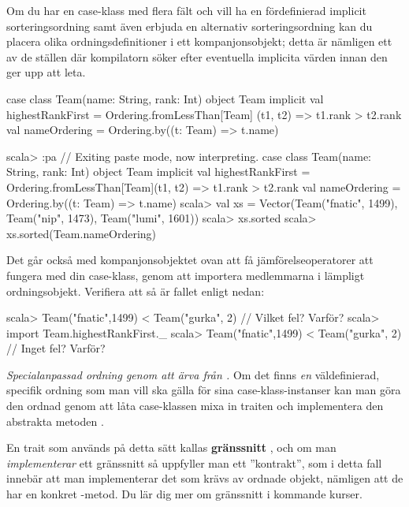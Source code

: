 \Subtask Om du har en case-klass med flera fält och vill ha en fördefinierad implicit sorteringsordning samt även erbjuda en alternativ sorteringsordning kan du placera olika ordningsdefinitioner i ett kompanjonsobjekt; detta är nämligen ett av de ställen där kompilatorn söker efter eventuella implicita värden innan den ger upp att leta. 
\begin{Code}
case class  Team(name: String, rank: Int)
object Team {
  implicit val highestRankFirst = Ordering.fromLessThan[Team]{
    (t1, t2) => t1.rank > t2.rank
  }
  val nameOrdering = Ordering.by((t: Team) => t.name)
}
\end{Code}
\begin{REPL}
scala> :pa
// Exiting paste mode, now interpreting.
case class  Team(name: String, rank: Int)
object Team {
  implicit val highestRankFirst = 
    Ordering.fromLessThan[Team]{(t1, t2) => t1.rank > t2.rank}
  val nameOrdering = Ordering.by((t: Team) => t.name)
}
scala> val xs = 
         Vector(Team("fnatic", 1499), Team("nip", 1473), Team("lumi", 1601))
scala> xs.sorted
scala> xs.sorted(Team.nameOrdering)
\end{REPL}



\Subtask Det går också med kompanjonsobjektet ovan att få jämförelseoperatorer att fungera med din case-klass, genom att importera medlemmarna i lämpligt ordningsobjekt. Verifiera att så är fallet enligt nedan:
\begin{REPL}
scala> Team("fnatic",1499) < Team("gurka", 2)  // Vilket fel? Varför?
scala> import Team.highestRankFirst._
scala> Team("fnatic",1499) < Team("gurka", 2)  // Inget fel? Varför?
\end{REPL}


\Task \emph{Specialanpassad ordning genom att ärva från .} Om det finns \emph{en} väldefinierad, specifik ordning som man vill ska gälla för sina case-klass-instanser kan man göra den ordnad genom att låta case-klassen mixa in traiten  och implementera den abstrakta metoden . 

\begin{Background}
En trait som används på detta sätt kallas \textbf{gränssnitt} , och om man \emph{implementerar} ett gränssnitt så uppfyller man ett ''kontrakt'', som i detta fall innebär att man implementerar det som krävs av ordnade objekt, nämligen att de har en konkret -metod. Du lär dig mer om gränssnitt i kommande kurser. 
\end{Background}

